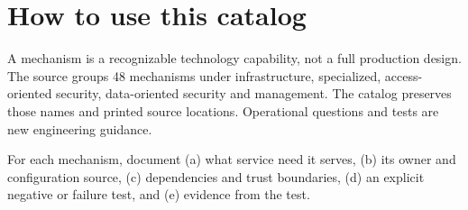 \documentclass[10pt,letterpaper]{article}
\begin{document}
\sourceStatement
\tableofcontents
\newpage
\section{How to use this catalog}
A mechanism is a recognizable technology capability, not a full production design. The source groups 48 mechanisms under infrastructure, specialized, access-oriented security, data-oriented security and management. The catalog preserves those names and printed source locations. Operational questions and tests are new engineering guidance.
\begin{takeaway}
For each mechanism, document (a) what service need it serves, (b) its owner and configuration source, (c) dependencies and trust boundaries, (d) an explicit negative or failure test, and (e) evidence from the test.
\end{takeaway}
\end{document}
